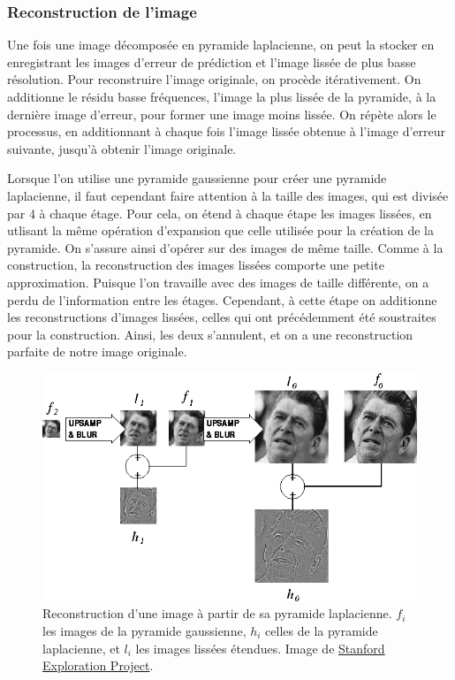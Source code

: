 \subsubsection{Reconstruction de l'image}

Une fois une image décomposée en pyramide laplacienne, on peut la stocker en enregistrant les images d'erreur de prédiction et l'image lissée de plus basse résolution. Pour reconstruire l'image originale, on procède itérativement. On additionne le résidu basse fréquences, l'image la plus lissée de la pyramide, à la dernière image d'erreur, pour former une image moins lissée. On répète alors le processus, en additionnant à chaque fois l'image lissée obtenue à l'image d'erreur suivante, jusqu'à obtenir l'image originale.

Lorsque l'on utilise une pyramide gaussienne pour créer une pyramide laplacienne, il faut cependant faire attention à la taille des images, qui est divisée par 4 à chaque étage. Pour cela, on étend à chaque étape les images lissées, en utlisant la même opération d'expansion que celle utilisée pour la création de la pyramide. On s'assure ainsi d'opérer sur des images de même taille. Comme à la construction, la reconstruction des images lissées comporte une petite approximation. Puisque l'on travaille avec des images de taille différente, on a perdu de l'information entre les étages. Cependant, à cette étape on additionne les reconstructions d'images lissées, celles qui ont précédemment été soustraites pour la construction. Ainsi, les deux s'annulent, et on a une reconstruction parfaite de notre image originale.

\begin{figure}
    \centering
    \includegraphics[width=.85\textwidth]{contenu/resources/images/laplacian_pyramid_reconstruction}
    \caption[Reconstruction d'une image à partir de sa pyramide laplacienne]{Reconstruction d'une image à partir de sa pyramide laplacienne. $f_i$ les images de la pyramide gaussienne, $h_i$ celles de la pyramide laplacienne, et $l_i$ les images lissées étendues. Image de \href{https://web.archive.org/web/20230203082428/http://sepwww.stanford.edu/data/media/public/sep/morgan/texturematch/paper_html/node3.html}{Stanford Exploration Project}.}
    \label{fig:laplace-reconstruction}
\end{figure}

